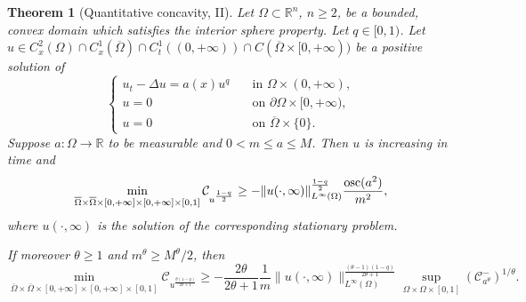\documentclass[11pt, reqno]{amsart}
\newtheorem{theorem}[lemma]{Theorem}
\theoremstyle{definition}
\numberwithin{equation}{section}
\newcommand{\Omegabar}{\overline{\Omega}}
\newcommand{\R}{\mathbb{R}}
\newcommand{\osc}{{\rm osc}}
\def\norm#1{\|#1\|}
\begin{document}
\begin{theorem}[Quantitative concavity, II]\label{thm_approximate concavity parabolic application a(x)u^gamma}
Let $\Omega \subset \R^n$, $n\geq 2$, be a bounded, convex domain which satisfies the interior sphere property.
 Let $q \in [0,1)$. 
Let $u\in C^2_x(\Omega)\cap C^1_x(\Omegabar) \cap C^1_t((0,+\infty)) \cap C(\Omegabar\times [0,+\infty))$ be a positive solution of 
$$		
\begin{cases}
u_t-\Delta u=a(x) u^q &\quad\text{in }\Omega\times (0,+\infty), \\
u=0 & \quad\text{on }\partial \Omega\times [0,+\infty),	 \\
u =0 & \quad \text{on } \Omegabar \times \{0\}.
\end{cases}
$$
Suppose $a\colon\Omega \to \R$ to be measurable and $0<m \leq a \leq M$.
 Then $u$ is increasing in time and 
\begin{equation}\label{eq_quantitativ_oscil}
\min_{\Omegabar\times \Omegabar\times[0,+\infty]\times [0,+\infty]\times[0,1]}\mathcal{C}_{u^{\frac{1-q}{2}}} \geq 
- \norm{u(\cdot, \infty)}_{L^{\infty}(\Omega)}^{\frac{1-q}{2}} \frac{\osc(a^2)}{m^2}, 
\end{equation}
where $u(\cdot, \infty)$ is the solution of the corresponding stationary problem.

If moreover $\theta \geq 1$ and $m^\theta\geq M^{\theta}/2$, then
\begin{equation}\label{eq_quantitative_theta}
	\min_{\Omegabar\times \Omegabar\times[0,+\infty]\times [0,+\infty]\times[0,1]}\mathcal{C}_{u^{\frac{\theta(1-q)}{2\theta+1}}}
\geq
-\frac{2\theta }{2\theta+1} \frac{1}{m} \norm{u(\cdot, \infty)}_{L^{\infty}(\Omega)}^{\frac{(\theta-1)(1-q)}{2\theta+1}}
\sup\limits_{\Omega \times \Omega\times[0,1]}
 (\mathcal{C}^-_{a^{\theta}})^{1/\theta}.
\end{equation}
\end{theorem}
\end{document}
